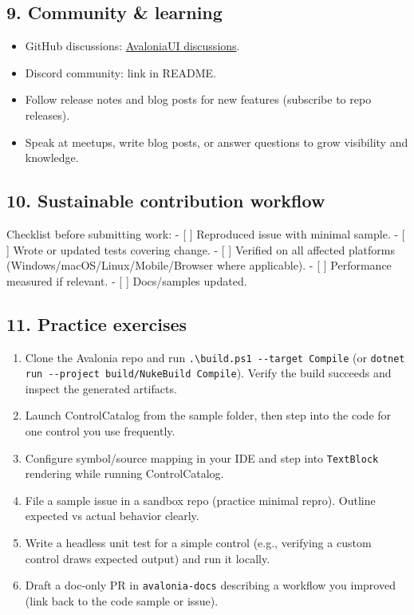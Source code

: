 \subsection{9. Community \& learning}\label{community-learning}

\begin{itemize}
\tightlist
\item
  GitHub discussions:
  \href{https://github.com/AvaloniaUI/Avalonia/discussions}{AvaloniaUI
  discussions}.
\item
  Discord community: link in README.
\item
  Follow release notes and blog posts for new features (subscribe to
  repo releases).
\item
  Speak at meetups, write blog posts, or answer questions to grow
  visibility and knowledge.
\end{itemize}

\subsection{10. Sustainable contribution
workflow}\label{sustainable-contribution-workflow}

Checklist before submitting work: - {[} {]} Reproduced issue with
minimal sample. - {[} {]} Wrote or updated tests covering change. - {[}
{]} Verified on all affected platforms
(Windows/macOS/Linux/Mobile/Browser where applicable). - {[} {]}
Performance measured if relevant. - {[} {]} Docs/samples updated.

\subsection{11. Practice exercises}\label{practice-exercises-21}

\begin{enumerate}
\def\labelenumi{\arabic{enumi}.}
\tightlist
\item
  Clone the Avalonia repo and run
  \passthrough{\lstinline!.\\build.ps1 --target Compile!} (or
  \passthrough{\lstinline!dotnet run --project build/NukeBuild Compile!}).
  Verify the build succeeds and inspect the generated artifacts.
\item
  Launch ControlCatalog from the sample folder, then step into the code
  for one control you use frequently.
\item
  Configure symbol/source mapping in your IDE and step into
  \passthrough{\lstinline!TextBlock!} rendering while running
  ControlCatalog.
\item
  File a sample issue in a sandbox repo (practice minimal repro).
  Outline expected vs actual behavior clearly.
\item
  Write a headless unit test for a simple control (e.g., verifying a
  custom control draws expected output) and run it locally.
\item
  Draft a doc-only PR in \passthrough{\lstinline!avalonia-docs!}
  describing a workflow you improved (link back to the code sample or
  issue).
\end{enumerate}

